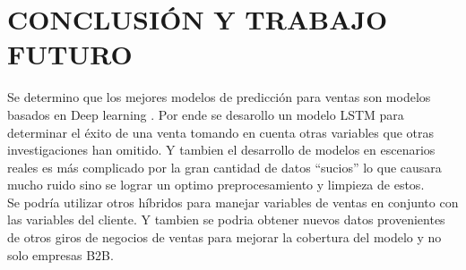 \documentclass[conference]{IEEEtran}
\begin{document}
\section*{CONCLUSIÓN Y TRABAJO FUTURO}
Se determino que los mejores modelos de predicción para ventas son modelos basados en Deep learning . Por ende se desarollo un modelo LSTM para determinar el éxito de una venta tomando en cuenta otras variables que otras investigaciones han omitido. Y tambien el desarrollo de modelos en escenarios reales es más complicado por la gran cantidad de datos “sucios” lo que causara mucho ruido sino se lograr un optimo preprocesamiento y limpieza de estos.\\
Se podría utilizar otros híbridos para manejar variables de ventas en conjunto con las variables del cliente. Y tambien se podria obtener nuevos datos provenientes de otros giros de negocios de ventas para mejorar la cobertura del modelo y no solo empresas B2B.
\end{document}
